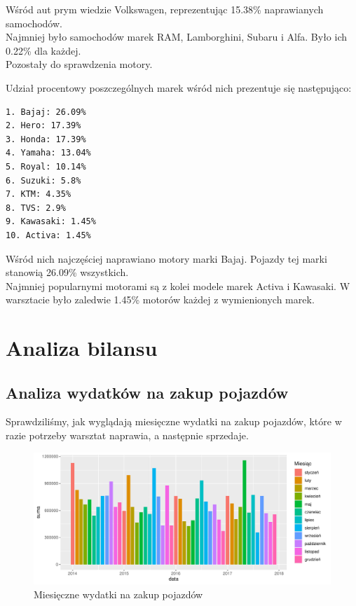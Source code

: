 \documentclass{article}\usepackage[]{graphicx}\usepackage[]{xcolor}
\makeatletter
\def\maxwidth{ %
  \ifdim\Gin@nat@width>\linewidth
    \linewidth
  \else
    \Gin@nat@width
  \fi
}
\newenvironment{knitrout}{}{} %
\makeatother
\begin{document}
Wśród aut prym wiedzie Volkswagen, reprezentując  15.38\% naprawianych samochodów. \\

Najmniej było samochodów marek RAM, Lamborghini, Subaru i Alfa. Było ich 0.22\% dla każdej. \\

Pozostały do sprawdzenia motory.



Udział procentowy poszczególnych marek wśród nich prezentuje się następująco:

\begin{verbatim}
1. Bajaj: 26.09%
2. Hero: 17.39%
3. Honda: 17.39%
4. Yamaha: 13.04%
5. Royal: 10.14%
6. Suzuki: 5.8%
7. KTM: 4.35%
8. TVS: 2.9%
9. Kawasaki: 1.45%
10. Activa: 1.45%
\end{verbatim}

Wśród nich najczęściej naprawiano motory marki Bajaj. Pojazdy tej marki stanowią 26.09\% wszystkich. \\

Najmniej popularnymi motorami są z kolei modele marek Activa i Kawasaki. W warsztacie było zaledwie 1.45\% motorów każdej z wymienionych marek.

\section{Analiza bilansu}

\subsection{Analiza wydatków na zakup pojazdów}

Sprawdziliśmy, jak wyglądają miesięczne wydatki na zakup pojazdów, które w razie potrzeby warsztat naprawia, a następnie sprzedaje.

\begin{knitrout}
\color{fgcolor}\begin{figure}[H]

{\centering \includegraphics[width=\maxwidth]{figure/fig_zakup_pojazdu-1} 

}

\caption[Miesięczne wydatki na zakup pojazdów]{Miesięczne wydatki na zakup pojazdów}\label{fig:fig_zakup_pojazdu}
\end{figure}

\end{knitrout}
\end{document}
